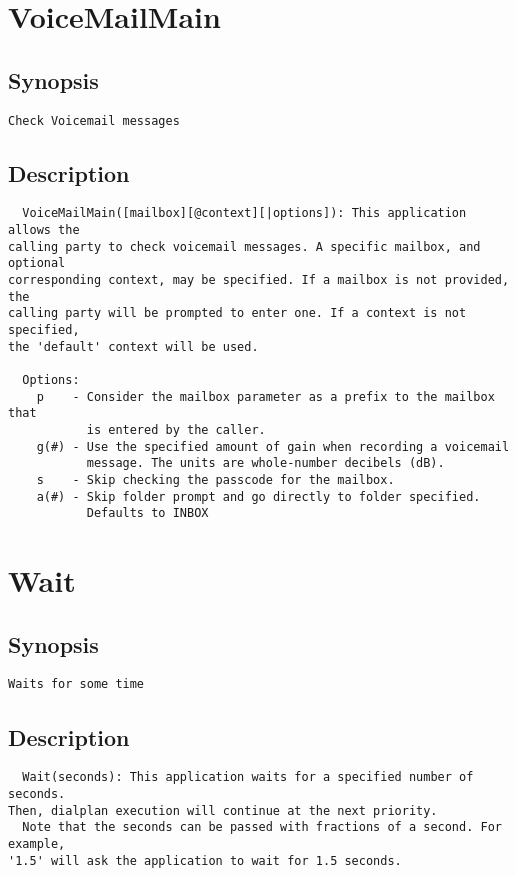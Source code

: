 \section{VoiceMailMain}
\subsection{Synopsis}
\begin{verbatim}
Check Voicemail messages
\end{verbatim}
\subsection{Description}
\begin{verbatim}
  VoiceMailMain([mailbox][@context][|options]): This application allows the
calling party to check voicemail messages. A specific mailbox, and optional
corresponding context, may be specified. If a mailbox is not provided, the
calling party will be prompted to enter one. If a context is not specified,
the 'default' context will be used.

  Options:
    p    - Consider the mailbox parameter as a prefix to the mailbox that
           is entered by the caller.
    g(#) - Use the specified amount of gain when recording a voicemail
           message. The units are whole-number decibels (dB).
    s    - Skip checking the passcode for the mailbox.
    a(#) - Skip folder prompt and go directly to folder specified.
           Defaults to INBOX

\end{verbatim}


\section{Wait}
\subsection{Synopsis}
\begin{verbatim}
Waits for some time
\end{verbatim}
\subsection{Description}
\begin{verbatim}
  Wait(seconds): This application waits for a specified number of seconds.
Then, dialplan execution will continue at the next priority.
  Note that the seconds can be passed with fractions of a second. For example,
'1.5' will ask the application to wait for 1.5 seconds.

\end{verbatim}



